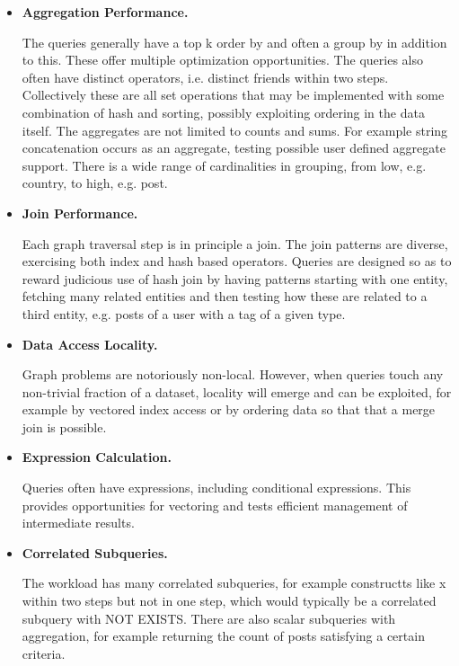 \begin{itemize}
    \item \textbf{Aggregation Performance.}

The queries generally have a top k order by and often a group by in
addition to this.  These offer multiple optimization opportunities.
The queries also often have distinct operators, i.e. distinct friends
within two steps.  Collectively these are all set operations that may
be implemented with some combination of hash and sorting, possibly
exploiting ordering in the data itself.  The aggregates are not
limited to counts and sums.  For example string concatenation occurs
as an aggregate, testing possible user defined aggregate support.
There is a wide range of cardinalities in grouping, from low, e.g. country, to high, e.g. post.

    \item \textbf{Join Performance.}

Each graph traversal step is in principle a join.  The join patterns are
diverse, exercising both index and hash based operators.   Queries are designed
so as to reward judicious use of hash join by having patterns starting with one
entity, fetching many related entities and then testing how these are related
to a third entity, e.g. posts of a user with a tag of a given type. 

    \item \textbf{Data Access Locality.}

Graph problems are notoriously non-local.  However, when queries touch
any non-trivial fraction of a dataset, locality will emerge and can be
exploited, for example by vectored index access or by ordering data so
that that a merge join is possible.

    \item \textbf{Expression Calculation.}

Queries often have expressions, including conditional expressions.
This provides opportunities for vectoring and tests efficient
management of intermediate results.

    \item \textbf{Correlated Subqueries.}

The workload has many correlated subqueries, for example constructts
like x within two steps but not in one step, which would typically be
a correlated subquery with NOT EXISTS.  There are also scalar
subqueries with aggregation, for example returning the count of posts
satisfying a certain criteria.



\end{itemize}
